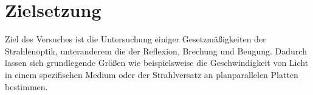 \section{Zielsetzung}
Ziel des Versuches ist die Untersuchung einiger Gesetzmäßigkeiten der Strahlenoptik, unteranderem die der Reflexion, Brechung und Beugung. Dadurch lassen sich grundlegende Größen wie beispielsweise die Geschwindigkeit von Licht in einem
spezifischen Medium oder der Strahlversatz an planparallelen Platten bestimmen.